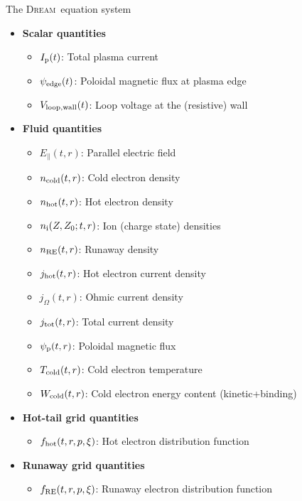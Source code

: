 \documentclass[titleunderline,widescreen1610]{chalmerspresentation}
\newcommand{\DREAM}{\textsc{Dream}}
\newcommand{\Efield}{E_\parallel}
\newcommand{\fhot}{f_{\rm hot}}
\newcommand{\fre}{f_{\rm RE}}
\newcommand{\Ip}{I_{\rm p}}
\newcommand{\ncold}{n_{\rm cold}}
\newcommand{\nhot}{n_{\rm hot}}
\newcommand{\ions}{n_{\rm i}}
\newcommand{\nre}{n_{\rm RE}}
\newcommand{\ntot}{n_{\rm tot}}
\newcommand{\jhot}{j_{\rm hot}}
\newcommand{\johm}{j_{\Omega}}
\newcommand{\jtot}{j_{\rm tot}}
\newcommand{\psiedge}{\psi_{\rm edge}}
\newcommand{\Vloopwall}{V_{\rm loop, wall}}
\newcommand{\psip}{\psi_{\rm p}}
\newcommand{\Tcold}{T_{\rm cold}}
\newcommand{\Wcold}{W_{\rm cold}}
\begin{document}
    \begin{frame}{The \DREAM\ equation system}
        \begin{itemize}
            \item {\bf Scalar quantities}
            \begin{itemize}
                \item $\Ip(t)$: Total plasma current
                \item $\psiedge(t)$: Poloidal magnetic flux at plasma edge
                \item $\Vloopwall(t)$: Loop voltage at the (resistive) wall
            \end{itemize}
            \item {\bf Fluid quantities}
            \begin{itemize}
                \item $\Efield(t,r)$: Parallel electric field
                \item $\ncold(t,r)$: Cold electron density
                \item $\nhot(t,r)$: Hot electron density
                \item $\ions(Z,Z_0;t,r)$: Ion (charge state) densities
                \item $\nre(t,r)$: Runaway density
                \item $\jhot(t,r)$: Hot electron current density
                \item $\johm(t,r)$: Ohmic current density
                \item $\jtot(t,r)$: Total current density
                \item $\psip(t,r)$: Poloidal magnetic flux
                \item $\Tcold(t,r)$: Cold electron temperature
                \item $\Wcold(t,r)$: Cold electron energy content (kinetic+binding)
            \end{itemize}
            \item {\bf Hot-tail grid quantities}
            \begin{itemize}
                \item $\fhot(t,r,p,\xi)$: Hot electron distribution function
            \end{itemize}
            \item {\bf Runaway grid quantities}
            \begin{itemize}
                \item $\fre(t,r,p,\xi)$: Runaway electron distribution function
            \end{itemize}
        \end{itemize}
    \end{frame}
\end{document}
